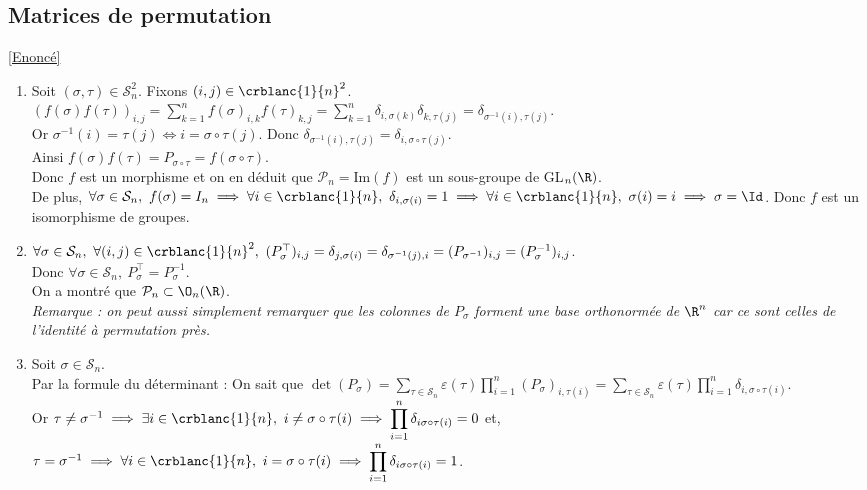 \documentclass[8pt]{book}
\begin{document}
	\subsection{Matrices de permutation }
	\label{Matrices de permutation corrigé}
	\textcolor{blue}{\hyperref[Matrices de permutation]{[Enoncé]}}\\
	\begin{enumerate}[leftmargin=*]
		\item Soit $(\sigma,\tau)\in \mathcal S_n^2$. Fixons $(i,j)\in \crblanc{1}{n}^2$.\\
		$(f(\sigma)f(\tau))_{i,j}=\displaystyle\sum\limits_{k=1}^nf(\sigma)_{i,k}f(\tau)_{k,j}=\sum\limits_{k=1}^n\delta_{i,\sigma(k)}\delta_{k,\tau(j)}=\delta_{\sigma^{-1}(i),\tau(j)}$.\\
		Or $\sigma^{-1}(i)=\tau(j)\iff i=\sigma\circ\tau(j)$. Donc $\delta_{\sigma^{-1}(i),\tau(j)}=\delta_{i,\sigma\circ\tau(j)}$.\\
		Ainsi $f(\sigma)f(\tau)=P_{\sigma\circ\tau}=f(\sigma\circ\tau)$.\\
		Donc $f$ est un morphisme et on en déduit que $\mathcal P_n=\text{Im}(f)$ est un sous-groupe de GL$_n(\R)$.\\
		De plus, $\forall \sigma\in \mathcal S_n,\ f(\sigma)=I_n\implies \forall i\in \crblanc{1}{n},\ \delta_{i,\sigma(i)}=1\implies \forall i\in \crblanc{1}{n},\ \sigma(i)=i\implies \sigma=\Id$. Donc $f$ est un isomorphisme de groupes.
		\item $\forall \sigma\in \mathcal S_n,\ \forall (i,j)\in \crblanc{1}{n}^2,\ (P_\sigma^\top)_{i,j}=\delta_{j,\sigma(i)}=\delta_{\sigma^{-1}(j),i}=(P_{\sigma^{-1}})_{i,j}=(P_\sigma^{-1})_{i,j}$.\\
		Donc $\forall \sigma\in \mathcal S_n,\ P_\sigma^\top=P_\sigma^{-1}$.\\
		On a montré que $\mathcal P_n\subset \O_n(\R)$.\\
		\textit{Remarque : on peut aussi simplement remarquer que les colonnes de $P_\sigma$ forment une base orthonormée de $\R^n$ car ce sont celles de l'identité à permutation près.}
		\item Soit $\sigma\in \mathcal S_n$.\\
		Par la formule du déterminant : On sait que $\det(P_\sigma)=\displaystyle\sum\limits_{\tau\in \mathcal S_n}\varepsilon(\tau)\prod\limits_{i=1}^n(P_\sigma)_{i,\tau(i)}=\sum\limits_{\tau\in \mathcal S_n}\varepsilon(\tau)\prod\limits_{i=1}^n\delta_{i,\sigma\circ\tau(i)}$.\\
		Or $\tau\ne \sigma^{-1}\implies \exists i\in \crblanc{1}{n},\ i\ne \sigma\circ\tau(i)\implies \displaystyle\prod\limits_{i=1}^n\delta_{i\sigma\circ\tau(i)}=0$ et, $\tau=\sigma^{-1}\implies \forall i\in \crblanc{1}{n},\ i=\sigma\circ\tau(i)\implies \displaystyle\prod\limits_{i=1}^n\delta_{i\sigma\circ\tau(i)}=1$.\\

\end{enumerate}
\end{document}
